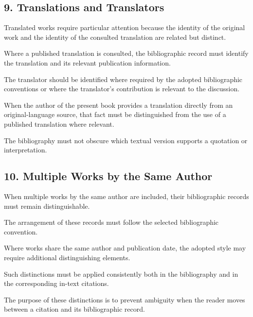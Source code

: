 \subsection*{9. Translations and Translators}

Translated works require
particular attention because
the identity of the original
work and the identity
of the consulted translation
are related but distinct.

Where a published translation
is consulted, the bibliographic
record must identify the
translation and its relevant
publication information.

The translator should be
identified where required
by the adopted bibliographic
conventions or where the
translator's contribution
is relevant to the discussion.

When the author of the
present book provides
a translation directly
from an original-language
source, that fact must
be distinguished from
the use of a published
translation where relevant.

The bibliography must
not obscure which textual
version supports a quotation
or interpretation.


\subsection*{10. Multiple Works by
the Same Author}

When multiple works by
the same author are included,
their bibliographic records
must remain distinguishable.

The arrangement of these
records must follow the
selected bibliographic
convention.

Where works share the
same author and publication
date, the adopted style
may require additional
distinguishing elements.

Such distinctions must
be applied consistently
both in the bibliography
and in the corresponding
in-text citations.

The purpose of these
distinctions is to prevent
ambiguity when the reader
moves between a citation
and its bibliographic record.


